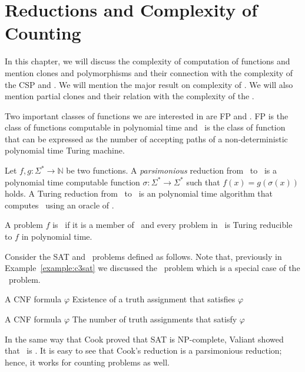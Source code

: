 \chapter{Reductions and Complexity of Counting}
In this chapter, we will discuss the complexity of computation of functions
and mention clones and polymorphisms and their connection with 
the complexity of the CSP and \ccsp\@. We will mention the major result on complexity of 
\ccsp\@. We will also mention partial clones and
their relation with the complexity of the \ccsp\@.

Two important classes of functions we are interested in are FP and \cp\@.
FP is the class of functions computable in polynomial time and \cp\ is
the class of function that can be expressed as the
number of accepting paths of a non-deterministic polynomial time Turing machine. 

Let \(f,g:\Sigma^*\to\mathbb{N}\) be two functions. A \emph{parsimonious} reduction 
from \mf\ to \mg\ is a polynomial time computable function
\(\sigma:\Sigma^*\to\Sigma^*\) such that
\(f(x)=g(\sigma(x))\) holds. 
A Turing reduction from \mf\ to \mg\ is an polynomial time algorithm
that computes \mf\ using an oracle of \mg\@.

\begin{defi} 
A problem \(f\) is \cpc\ if it is a member of \cp\ and every problem in \cp\ is 
Turing reducible to \(f\) in polynomial time.
\end{defi}

Consider the SAT and \csat\ problems defined as follows.
Note that, previously in Example~\ref{example:c3sat} we discussed the \ctsat\ problem
which is a special case of the \csat\ problem.


{A CNF formula \(\varphi\)}
{Existence of a truth assignment that satisfies \(\varphi\)}

\pdef{\csat}
{A CNF formula \(\varphi\)}
{The number of truth assignments that satisfy \(\varphi\)}

In the same way that Cook \cite{cook1971} proved that SAT is NP-complete,
Valiant \cite{Valiant1979} showed that \csat\ is \cpc\@. It is easy to see that 
Cook's reduction is a parsimonious reduction; hence, it works for counting problems
as well. 

